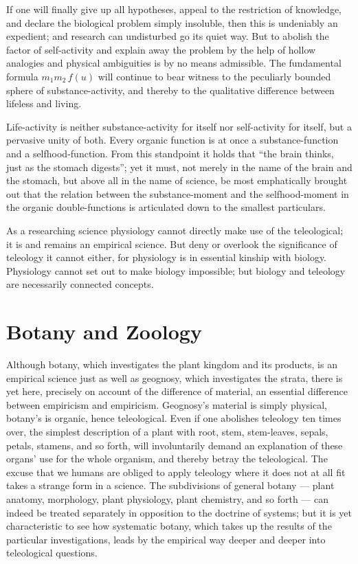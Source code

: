 \documentclass[12pt]{book}
\begin{document}
If one will finally give up all hypotheses, appeal to the restriction of knowledge, and
declare the biological problem simply insoluble, then this is undeniably an expedient; and
research can undisturbed go its quiet way. But to abolish the factor of self-activity and
explain away the problem by the help of hollow analogies and physical ambiguities is by no
means admissible. The fundamental formula $m_1 m_2\, f(u)$ will continue to bear witness to
the peculiarly bounded sphere of substance-activity, and thereby to the qualitative
difference between lifeless and living.

Life-activity is neither substance-activity for itself nor self-activity for itself, but a
pervasive unity of both. Every organic function is at once a substance-function and a
selfhood-function. From this standpoint it holds that ``the brain thinks, just as the
stomach digests''; yet it must, not merely in the name of the brain and the stomach, but
above all in the name of science, be most emphatically brought out that the relation between
the substance-moment and the selfhood-moment in the organic double-functions is articulated
down to the smallest particulars.

As a researching science physiology cannot directly make use of the teleological; it is and
remains an empirical science. But deny or overlook the significance of teleology it cannot
either, for physiology is in essential kinship with biology. Physiology cannot set out to
make biology impossible; but biology and teleology are necessarily connected concepts.

\section{Botany and Zoology}
\label{sec:18}

\noindent Although botany, which investigates the plant kingdom and its products, is an
empirical science just as well as geognosy, which investigates the strata, there is yet
here, precisely on account of the difference of material, an essential difference between
empiricism and empiricism. Geognosy's material is simply physical, botany's is organic,
hence teleological. Even if one abolishes teleology ten times over, the simplest
description of a plant with root, stem, stem-leaves, sepals, petals, stamens, and so
forth, will involuntarily demand an explanation of these organs' use for the whole
organism, and thereby betray the teleological. The excuse that we humans are obliged to
apply teleology where it does not at all fit takes a strange form in a science. The
subdivisions of general botany --- plant anatomy, morphology, plant physiology, plant
chemistry, and so forth --- can indeed be treated separately in opposition to the
doctrine of systems; but it is yet characteristic to see how systematic botany, which
takes up the results of the particular investigations, leads by the empirical way deeper
and deeper into teleological questions.
\end{document}
